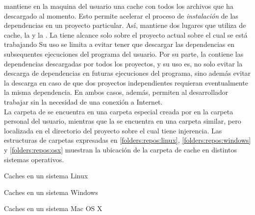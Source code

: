 \fronttier mantiene en la maquina del usuario una cache con
todos los archivos que ha descargado al momento. Esto permite
acelerar el proceso de \emph{instalación} de las dependencias
en un proyecto  particular. Así, \fronttier mantiene dos lugares
que utiliza de cache, la \cachel y la \cacheg. La \cachel tiene
alcance solo sobre el proyecto actual sobre el cual se está trabajando
Su uso se limita a evitar tener que descargar las dependencias en subsequentes
ejecuciones del programa del usuario. Por su parte, la \cacheg
contiene las dependencias descargadas por todos los proyectos, y su uso
es, no solo evitar la descarga de dependencias en futuras ejecuciones del
programa, sino además evitar la descarga en caso de que dos proyectos
independientes requieran eventualmente la misma dependencia. En ambos
casos, además, permiten al desarrollador trabajar sin la necesidad de
una conexión a Internet.\\
La carpeta de \cacheg se encuentra en una carpeta especial creada
por \fronttier en la carpeta personal del usuario, mientras que la \cachel
se encuentra en una carpeta similar, pero localizada en el directorio
del proyecto sobre el cual tiene injerencia. Las estructuras de carpetas
expresadas en \ref{folders:repos:linux}, \ref{folders:repos:windows} y
\ref{folders:repos:osx} muestran la ubicación de la carpeta de cache
en distintos sistemas operativos.

\begin{folders}[h]
	\caption{Caches en un sistema Linux}
	\label{folders:repos:linux}
\end{folders}

\begin{folders}[h]
	\caption{Caches en un sistema Windows}
	\label{folders:repos:windows}
\end{folders}

\begin{folders}[h]
	\caption{Caches en un sistema Mac OS X}
	\label{folders:repos:osx}
\end{folders}

